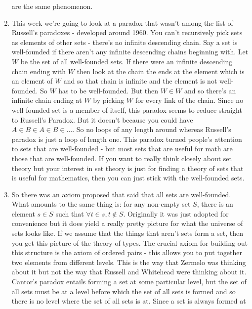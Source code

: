 \documentclass[12pt]{article}
\theoremstyle{definition}
\begin{document}
\begin{enumerate}
        are the same phenomenon. 
    \item
        This week we're going to look at a paradox that wasn't among the list of
        Russell's paradoxes - developed around 1960. You can't recursively pick
        sets as elements of other sets - there's no infinite descending chain.
        Say a set is well-founded if there aren't any infinite descending
        chains beginning with. Let $W$ be the set of all well-founded sets. If
        there were an infinite descending chain ending with $W$ then look at
        the chain the ends at the element which is an element of $W$ and so
        that chain is infinite and the element is not well-founded. So $W$ has
        to be well-founded. But then $W \in W$ and so there's an infinite chain
        ending at $W$ by picking $W$ for every link of the chain. Since no
        well-founded set is a member of itself, this paradox seems to reduce
        straight to Russell's Paradox. But it doesn't because you could have $A
        \in B \in A \in B \in \dots$. So no loops of any length around whereas
        Russell's paradox is just a loop of length one. This paradox turned
        people's attention to sets that are well-founded - but most sets that
        are useful for math are those that are well-founded. If you want to
        really think closely about set theory but your interest in set theory
        is just for finding a theory of sets that is useful for mathematics,
        then you can just stick with the well-founded sets.
    \item
        So there was an axiom proposed that said that all sets are
        well-founded. What amounts to the same thing is: for any non-empty set
        $S$, there is an element $s \in S$ such that $\forall t \in s, t \notin
        S$. Originally it was just adopted for convenience but it does yield a
        really pretty picture for what the universe of sets looks like. If we
        assume that the things that aren't sets form a set, then you get this
        picture of the theory of types. The crucial axiom for building out this
        structure is the axiom of ordered pairs - this allows you to put
        together two elements from different levels. This is the way that
        Zermelo was thinking about it but not the way that Russell and
        Whitehead were thinking about it. Cantor's paradox entails forming a
        set at some particular level, but the set of all sets must be at a
        level before which the set of all sets is formed and so there is no
        level where the set of all sets is at. Since a set is always formed at

\end{enumerate}
\end{document}
